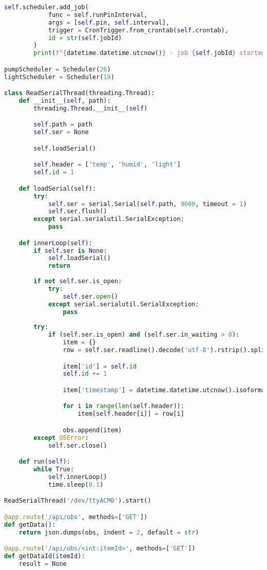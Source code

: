 \documentclass[12pt,a4paper,oneside]{book}
\begin{document}
\begin{lstlisting}[title={raspberrypi/api/data.py}, language=Python]
        self.scheduler.add_job(
            func = self.runPinInterval,
            args = [self.pin, self.interval],
            trigger = CronTrigger.from_crontab(self.crontab),
            id = str(self.jobId)
        )
        print(f"{datetime.datetime.utcnow()} - job {self.jobId} started")

pumpScheduler = Scheduler(26)
lightScheduler = Scheduler(19)

class ReadSerialThread(threading.Thread):
    def __init__(self, path):
        threading.Thread.__init__(self)

        self.path = path
        self.ser = None

        self.loadSerial()

        self.header = ['temp', 'humid', 'light']
        self.id = 1

    def loadSerial(self):
        try:
            self.ser = serial.Serial(self.path, 9600, timeout = 1)
            self.ser.flush()
        except serial.serialutil.SerialException:
            pass

    def innerLoop(self):
        if self.ser is None:
            self.loadSerial()
            return
        
        if not self.ser.is_open:
            try:
                self.ser.open()
            except serial.serialutil.SerialException:
                pass
        
        try:
            if (self.ser.is_open) and (self.ser.in_waiting > 0):
                item = {}
                row = self.ser.readline().decode('utf-8').rstrip().split(',')

                item['id'] = self.id
                self.id += 1

                item['timestamp'] = datetime.datetime.utcnow().isoformat()

                for i in range(len(self.header)):
                    item[self.header[i]] = row[i]

                obs.append(item)
        except OSError:
            self.ser.close()

    def run(self):
        while True:
            self.innerLoop()
            time.sleep(0.1)

ReadSerialThread('/dev/ttyACM0').start()

@app.route('/api/obs', methods=['GET'])
def getData():
    return json.dumps(obs, indent = 2, default = str)

@app.route('/api/obs/<int:itemId>', methods=['GET'])
def getDataId(itemId):
    result = None


\end{lstlisting}
\end{document}
